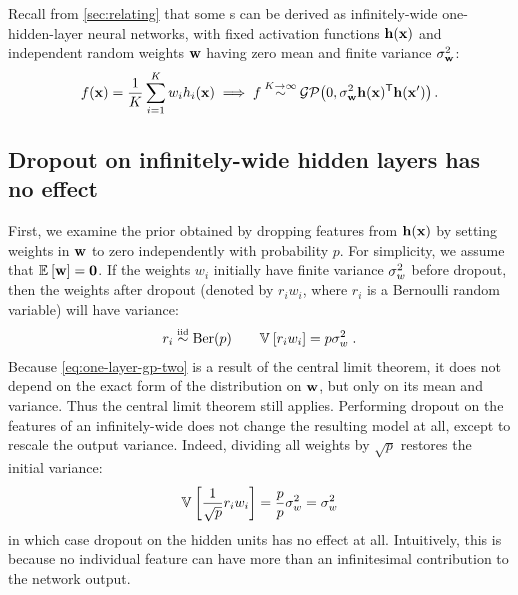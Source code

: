 \documentclass{article} %
\begin{document}
Recall from \cref{sec:relating} that some \gp{}s can be derived as infinitely-wide one-hidden-layer neural networks, with fixed activation functions ${\bf{h}}({\bf{x}})$ and independent random weights ${\bf{w}}$ having zero mean and finite variance $\sigma^2_{{\bf{w}}}$:
%
\begin{align}
f({\bf{x}}) 
= \frac{1}{K} \sum_{i=1}^K w_i h_i({\bf{x}})
\implies f \mathbin{\overset{K \to \infty}{\sim}} \mathcal{GP}\!\left(0,\sigma^2_{{\bf{w}}} {\bf{h}}({\bf{x}})^{\mathsf{T}}{\bf{h}}({\bf{x}}')\right) .
\label{eq:one-layer-gp-two}
\end{align}
%



\subsection{Dropout on infinitely-wide hidden layers has no effect}

First, we examine the prior obtained by dropping features from ${\bf{h}}({\bf{x}})$ by setting weights in ${\bf{w}}$ to zero independently with probability $p$.
For simplicity, we assume that $\mathbb{E}_{} \left[ {{\bf{w}}} \right] = {\bf{0}}$.
If the weights $w_i$ initially have finite variance $\sigma^2_{w}$ before dropout, then the weights after dropout (denoted by $r_i w_i$, where $r_i$ is a Bernoulli random variable) will have variance:
%
\begin{align}
r_i \simiid \textnormal{Ber}(p) \qquad
\varianceargs{}{r_i \netweights_i} = p \sigma_{\netweights}^2 \;.
\end{align}
%
Because \cref{eq:one-layer-gp-two} is a result of the central limit theorem, it does not depend on the exact form of the distribution on ${\bf{w}}$, but only on its mean and variance.
Thus the central limit theorem still applies.
Performing dropout on the features of an infinitely-wide \MLP{} does not change the resulting model at all, except to rescale the output variance.
Indeed, dividing all weights by $\sqrt p$ restores the initial variance:
%
\begin{align}
\mathbb{V}_{} \left[ { \frac{1}{\sqrt p} r_i w_i} \right] = \frac{p}{p} \sigma_{w}^2 = \sigma_{w}^2
\end{align}
%
in which case dropout on the hidden units has no effect at all.
Intuitively, this is because no individual feature can have more than an infinitesimal contribution to the network output.
\end{document}
